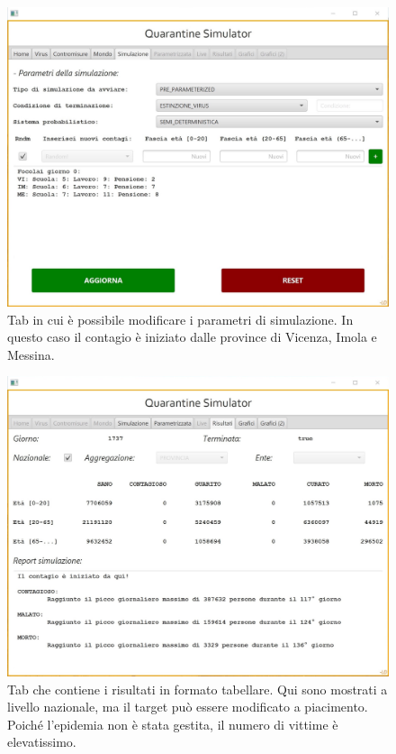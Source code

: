 \documentclass[a4paper, 12pt]{article}
\begin{document}
\begin{figure}[H]
	\centering
	\includegraphics[height=0.4\textheight]{IMG/2.jpg}
	\caption[App: Tab Simulazione]{Tab in cui è possibile modificare i parametri di simulazione. In questo caso il contagio è iniziato dalle province di Vicenza, Imola e Messina.}
	\label{fig:screen2}
\end{figure}

\begin{figure}[H]
	\centering
	\includegraphics[height=0.4\textheight]{IMG/3.jpg}
	\caption[App: Tab Risultati]{Tab che contiene i risultati in formato tabellare. Qui sono mostrati a livello nazionale, ma il target può essere modificato a piacimento. Poiché l'epidemia non è stata gestita, il numero di vittime è elevatissimo.}
	\label{fig:screen3}
\end{figure}
\end{document}
